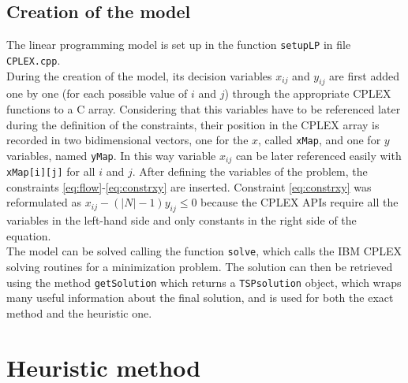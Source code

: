 \subsection{Creation of the model}
The linear programming model is set up in the function \texttt{setupLP} in file \texttt{CPLEX.cpp}.\\
During the creation of the model, its decision variables $x_{ij}$ and $y_{ij}$ are first added one by one (for each possible value of $i$ and $j$) through the appropriate CPLEX functions to a C array. Considering that this variables have to be referenced later during the definition of the constraints, their position in the CPLEX array is recorded in two bidimensional vectors, one for the $x$, called \texttt{xMap}, and one for $y$ variables, named \texttt{yMap}. In this way variable $x_{ij}$ can be later referenced easily with \texttt{xMap[i][j]} for all $i$ and $j$. After defining the variables of the problem, the constraints \ref{eq:flow}-\ref{eq:constrxy} are inserted. Constraint \ref{eq:constrxy} was reformulated as $x_{ij} - (|N|-1)y_{ij} \le 0$ because the CPLEX APIs require all the variables in the left-hand side and only constants in the right side of the equation.\\
The model can be solved calling the function \texttt{solve}, which calls the IBM CPLEX solving routines for a minimization problem. The solution can then be retrieved using the method \texttt{getSolution} which returns a \texttt{TSPsolution} object, which wraps many useful information about the final solution, and is used for both the exact method and the heuristic one.

\section{Heuristic method}
\label{chap:heuris}

